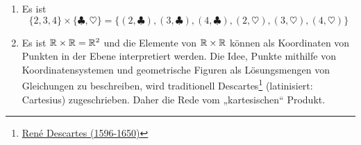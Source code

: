 \begin{bsp} \quad
    \begin{enumerate}
        \item Es ist
            \[ \{2,3,4\}\times \{ \clubsuit,\heartsuit\} = \{ (2,\clubsuit), (3,\clubsuit), (4,\clubsuit), (2,\heartsuit), (3,\heartsuit), (4,\heartsuit) \}\]
        \item Es ist $\mathbb R\times \mathbb R=\mathbb R^2$ und die Elemente von $\mathbb R\times \mathbb R$ können als Koordinaten von Punkten in der Ebene interpretiert werden. Die Idee, Punkte mithilfe von Koordinatensystemen und geometrische Figuren als Lösungsmengen von Gleichungen zu beschreiben, wird traditionell Descartes\footnote{\href{https://de.wikipedia.org/wiki/Rene_Descartes}{René Descartes (1596-1650)}} (latinisiert: Cartesius) zugeschrieben. Daher die Rede vom „kartesischen“ Produkt.
        \begin{comment}
        \item Dagegen lässt sich $\N\times\N$ als zweidimensionales „Gitter“ veranschaulichen:
            \[ \begin{matrix}
                \vdots &&&& \\
                (0,3) & \vdots &&& \\
                (0,2) & (1,2) &&& \\
                (0,1) & (1,1) & (2,1) & \cdots & \\
                (0,0) & (1,0) & (2,0) & (3,0) & \cdots
            \end{matrix} \]
        \end{comment}
    \end{enumerate}
\end{bsp}


